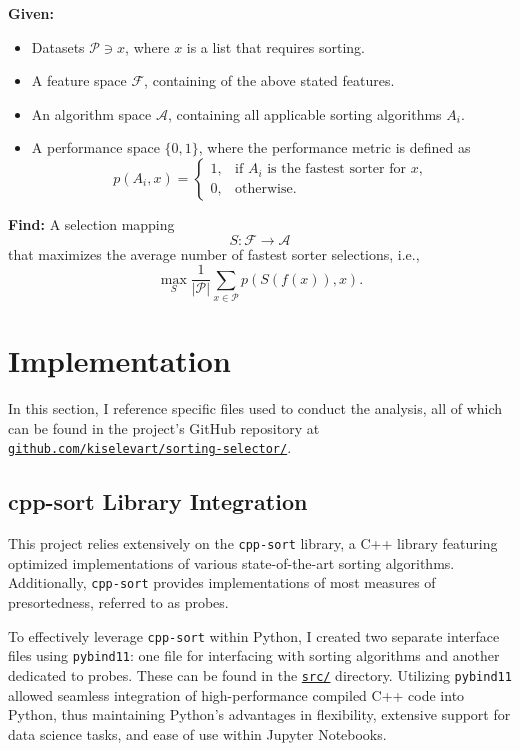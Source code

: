 \documentclass[twocolumn]{article}
\newcommand{\vsp}{\vspace{0.5em}}
\begin{document}
\vsp

\noindent \textbf{Given:}
\begin{itemize}[itemsep=0.05em, topsep=0pt]
    \item Datasets $\mathcal{P} \ni x$, where $x$ is a list that requires sorting.
    \item A feature space $\mathcal{F}$, containing of the above stated features.
    \item An algorithm space $\mathcal{A}$, containing all applicable sorting algorithms $A_i$.
    \item A performance space $\{0,1\}$, where the performance metric is defined as
    \[
    p(A_i, x) = 
    \begin{cases}
    1, & \text{if } A_i \text{ is the fastest sorter for } x, \\
    0, & \text{otherwise.}
    \end{cases}
    \]
\end{itemize}

\noindent \textbf{Find:} A selection mapping
\[
S: \mathcal{F} \rightarrow \mathcal{A}
\]
that maximizes the average number of fastest sorter selections, i.e.,
\[
\max_{S} \frac{1}{|\mathcal{P}|} \sum_{x \in \mathcal{P}} p(S(f(x)), x).
\]

\section{Implementation}
In this section, I reference specific files used to conduct the analysis, all of which can be found in the project's GitHub repository at \href{https://github.com/kiselevart/sorting-selector/}{\texttt{github.com/kiselevart/sorting-selector/}}.

\subsection{cpp-sort Library Integration}
This project relies extensively on the \texttt{cpp-sort}\cite{cppsort_benchmarks} library, a C++ library featuring optimized implementations of various state-of-the-art sorting algorithms. Additionally, \texttt{cpp-sort} provides implementations of most measures of presortedness, referred to as probes.

To effectively leverage \texttt{cpp-sort} within Python, I created two separate interface files using \texttt{pybind11}: one file for interfacing with sorting algorithms and another dedicated to probes. These can be found in the \href{https://github.com/kiselevart/sorting-selector/tree/main/Implementation/src}{\texttt{src/}} directory. Utilizing \texttt{pybind11} allowed seamless integration of high-performance compiled C++ code into Python, thus maintaining Python's advantages in flexibility, extensive support for data science tasks, and ease of use within Jupyter Notebooks.
\end{document}
